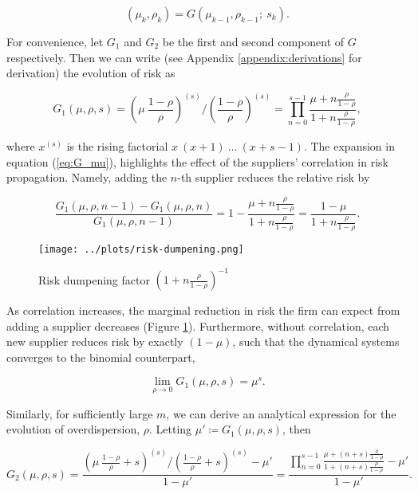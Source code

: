 \documentclass[../../main.tex]{subfiles}
\begin{document}
\begin{equation}
  (\mu_k, \rho_k) = G(\mu_{k - 1}, \rho_{k - 1}; \ s_k).
\end{equation}

For convenience, let $G_1$ and $G_2$ be the first and second component of $G$ respectively. Then we can write (see Appendix \ref{appendix:derivations} for derivation) the evolution of risk as

\begin{equation} \label{eq:G_mu}
  G_1(\mu, \rho, s) = \left( \mu \  \frac{1 - \rho}{\rho} \right)^{(s)} \Big/ \left(\frac{1 - \rho}{\rho} \right)^{(s)} = \prod^{s - 1}_{n = 0} \frac{\mu + n \frac{\rho}{1 - \rho}}{1 + n \frac{\rho}{1 - \rho}},
\end{equation}

where $x^{(s)}$ is the rising factorial $x \ (x + 1) \ \ldots \ (x + s - 1)$. The expansion in equation (\ref{eq:G_mu}), highlights the effect of the suppliers' correlation in risk propagation. Namely, adding the $n$-th supplier reduces the relative risk by

\begin{equation}
  \frac{G_1(\mu, \rho, n - 1) - G_1(\mu, \rho, n)}{G_1(\mu, \rho, n - 1)} = 1 - \frac{\mu + n \frac{\rho}{1 - \rho}}{1 + n \frac{\rho}{1 - \rho}} = \frac{1 - \mu}{1 + n \frac{\rho}{1 - \rho}}.
\end{equation}

\begin{figure}[H]
  \centering
  \texttt{[image: ../plots/risk-dumpening.png]}
  \caption{Risk dumpening factor $\left(1 + n \frac{\rho}{1 - \rho}\right)^{-1}$}
  \label{fig:risk-dumpening}
\end{figure}

As correlation increases, the marginal reduction in risk the firm can expect from adding a supplier decreases (Figure \ref{fig:risk-dumpening}). Furthermore, without correlation, each new supplier reduces risk by exactly $(1-\mu)$, such that the dynamical systems converges to the binomial counterpart,

\begin{equation}
  \lim_{\rho \rightarrow 0} G_1(\mu, \rho, s) = \mu^s.
\end{equation}

Similarly, for sufficiently large $m$, we can derive an analytical expression for the evolution of overdispersion, $\rho$. Letting $\mu' \coloneqq G_1(\mu, \rho, s)$, then

\begin{equation}
  G_2(\mu, \rho, s) = \frac{\left( \mu \  \frac{1 - \rho}{\rho} + s \right)^{(s)} \Big/ \left( \frac{1 - \rho}{\rho} + s \right)^{(s)} - \mu'}{1 - \mu'} = \frac{\prod^{s - 1}_{n = 0} \frac{\mu + (n + s) \frac{\rho}{1 - \rho}}{1 + (n + s) \frac{\rho}{1 - \rho}} - \mu'}{1 - \mu'}.
\end{equation}
\end{document}
